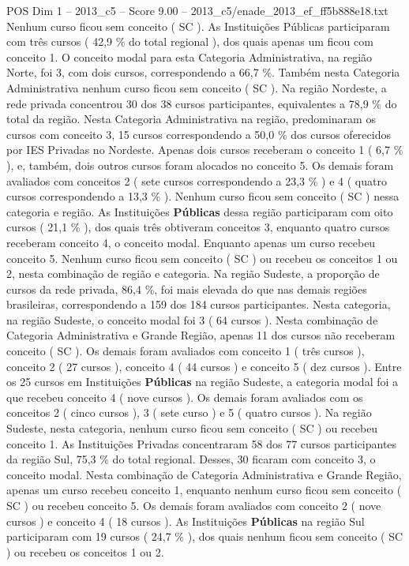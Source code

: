 \begin{textsample}{POS Dim 1 – 2013\_c5 – Score 9.00 – 2013\_c5/enade\_2013\_ef\_ff5b888e18.txt}
Nenhum curso ficou sem conceito ( SC ).
As Instituições Públicas participaram com três cursos ( 42,9 \% do total regional ), dos quais apenas um ficou com conceito 1.
O conceito modal para esta Categoria Administrativa, na região Norte, foi 3, com dois cursos, correspondendo a 66,7 \%.
Também nesta Categoria Administrativa nenhum curso ficou sem conceito ( SC ).
Na região Nordeste, a rede privada concentrou 30 dos 38 cursos participantes, equivalentes a 78,9 \% do total da região.
Nesta Categoria Administrativa na região, predominaram os cursos com conceito 3, 15 cursos correspondendo a 50,0 \% dos cursos oferecidos por IES Privadas no Nordeste.
Apenas dois cursos receberam o conceito 1 ( 6,7 \% ), e, também, dois outros cursos foram alocados no conceito 5.
Os demais foram avaliados com conceitos 2 ( sete cursos correspondendo a 23,3 \% ) e 4 ( quatro cursos correspondendo a 13,3 \% ).
Nenhum curso ficou sem conceito ( SC ) nessa categoria e região.
As Instituições \textbf{Públicas} dessa região participaram com oito cursos ( 21,1 \% ), dos quais três obtiveram conceitos 3, enquanto quatro cursos receberam conceito 4, o conceito modal.
Enquanto apenas um curso recebeu conceito 5.
Nenhum curso ficou sem conceito ( SC ) ou recebeu os conceitos 1 ou 2, nesta combinação de região e categoria.
Na região Sudeste, a proporção de cursos da rede privada, 86,4 \%, foi mais elevada do que nas demais regiões brasileiras, correspondendo a 159 dos 184 cursos participantes.
Nesta categoria, na região Sudeste, o conceito modal foi 3 ( 64 cursos ).
Nesta combinação de Categoria Administrativa e Grande Região, apenas 11 dos cursos não receberam conceito ( SC ).
Os demais foram avaliados com conceito 1 ( três cursos ), conceito 2 ( 27 cursos ), conceito 4 ( 44 cursos ) e conceito 5 ( dez cursos ).
Entre os 25 cursos em Instituições \textbf{Públicas} na região Sudeste, a categoria modal foi a que recebeu conceito 4 ( nove cursos ).
Os demais foram avaliados com os conceitos 2 ( cinco cursos ), 3 ( sete curso ) e 5 ( quatro cursos ).
Na região Sudeste, nesta categoria, nenhum curso ficou sem conceito ( SC ) ou recebeu conceito 1.
As Instituições Privadas concentraram 58 dos 77 cursos participantes da região Sul, 75,3 \% do total regional.
Desses, 30 ficaram com conceito 3, o conceito modal.
Nesta combinação de Categoria Administrativa e Grande Região, apenas um curso recebeu conceito 1, enquanto nenhum curso ficou sem conceito ( SC ) ou recebeu conceito 5.
Os demais foram avaliados com conceito 2 ( nove cursos ) e conceito 4 ( 18 cursos ).
As Instituições \textbf{Públicas} na região Sul participaram com 19 cursos ( 24,7 \% ), dos quais nenhum ficou sem conceito ( SC ) ou recebeu os conceitos 1 ou 2.

\end{textsample}
